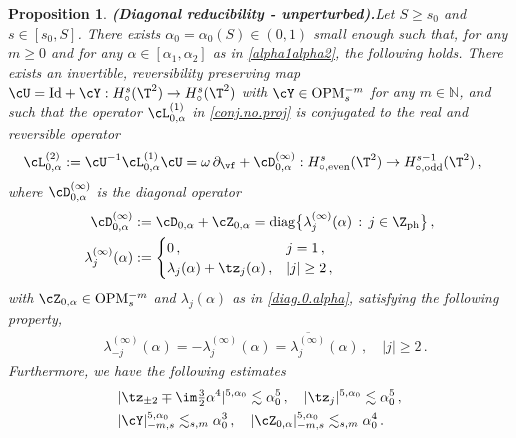 \documentclass[a4paper,reqno,10pt]{article}
\newtheorem{pro}{Proposition}[section]
\newcommand{\pa}{\partial}
\newcommand{\OpM}{{\rm O}{\rm P}{\rm M}}
\begin{document}
\begin{pro}{\bf (Diagonal reducibility - unperturbed).}\label{prop.diag.red.equi}
	Let $   S\geq s_0$ and $s\in [s_0,S]$. There exists $\alpha_{0}=\alpha_{0}(S)\in (0,1)$ small enough such that, for any $m\geq 0$  and for any $\alpha\in [\alpha_{1},\alpha_{2}]$ as in \eqref{alpha1alpha2}, the following holds. There exists an invertible, reversibility preserving map $\cU={\rm Id} + \cY:H_{\circ}^s(\T^2)\to H_{\circ}^s(\T^2)$ with $\cY \in \OpM_{s}^{-m}$ for any $m\in\mathbb{N}$, and such that the operator $\cL_{0,\alpha}^{(1)}$ in \eqref{conj.no.proj} is conjugated to the real and reversible operator
	\begin{align}
		\cL_{0,\alpha}^{(2)} & := \cU^{-1} \cL_{0,\alpha}^{(1)} \cU = \omega\,\pa_{\vf} + \cD_{0,\alpha}^{(\infty)} :H_{\circ,{\rm even}}^s(\T^2) \to H_{\circ,{\rm odd}}^{s-1}(\T^2) \,,
	\end{align}
	where $\cD_{0,\alpha}^{(\infty)} $ is the diagonal operator
	\begin{align}
		\cD_{0,\alpha}^{(\infty)} & := \cD_{0,\alpha} + \cZ_{0,\alpha} =  {\rm diag}\big\{ \lambda_{j}^{(\infty)}(\alpha) \, : \, j\in\Z_{\rm ph} \big\} \,, \\
		\lambda_{j}^{(\infty)}(\alpha) &:= \begin{cases}
			0\,, & j= 1\,, \\
			\lambda_{j}(\alpha) + \tz_{j}(\alpha) \,, & |j|\geq 2\,,
		\end{cases} \label{lambda.linear}
	\end{align}
	with $\cZ_{0,\alpha}\in\OpM_{s}^{-m}$ and $\lambda_{j}(\alpha)$  as in \eqref{diag.0.alpha}, 
	satisfying the following property, \begin{equation}\label{pure.im.lambda}
		\begin{aligned}
			&	\lambda_{-j}^{(\infty)}(\alpha)=	- \lambda_{j}^{(\infty)}(\alpha) = \overline{\lambda_{j}^{(\infty)}}(\alpha) \,, 
			\quad |j|\geq 2\,.
		\end{aligned}
	\end{equation}
	Furthermore, we have the following estimates
	\begin{align}
		& |\tz_{\pm 2} \mp \im \tfrac32 \alpha^4|^{5,\alpha_{0}} \lesssim \alpha_{0}^5 \,, \quad  |\tz_{j}|^{5,\alpha_{0}} \lesssim \alpha_{0}^5 \,,  \label{tz.est}\\
		& |\cY|_{-m,s}^{5,\alpha_{0}} \lesssim_{s,m} \alpha_{0}^3 \,, \quad |\cZ_{0,\alpha}|_{-m,s}^{5,\alpha_{0}}\lesssim_{s,m}\alpha_{0}^{4}\,. \label{Y.gen.est}
	\end{align}
\end{pro}
\end{document}
